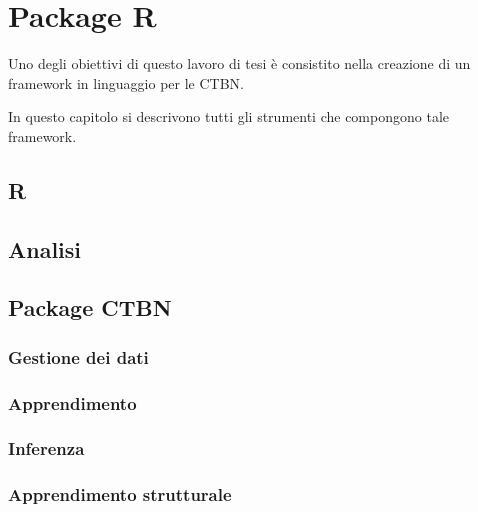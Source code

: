 
\chapter{Package R}
\label{cap:ctbnr}
Uno degli obiettivi di questo lavoro di tesi è consistito nella creazione di un framework in linguaggio  per le \acs{CTBN}.

In questo capitolo si descrivono tutti gli strumenti che compongono tale framework.

\section{R}
\omissis{}

\section{Analisi}
\omissis{}


\section{Package CTBN}
\omissis{}

\subsection{Gestione dei dati}\label{subsec:rctbn-ds-management}
\omissis{}

\subsection{Apprendimento}\label{subsec:rctbn-learning}
\omissis{}

\subsection{Inferenza}\label{subsec:rctbn-inference}
\omissis{}

\subsection{Apprendimento strutturale}\label{subsec:rctbn-structurallearning}
\omissis{}

